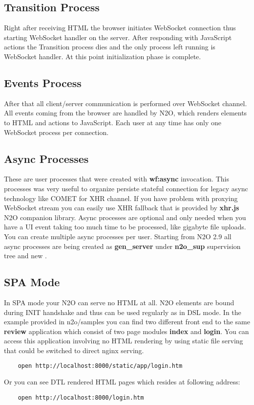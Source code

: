 \subsection{Transition Process}
Right after receiving HTML the browser initiates WebSocket connection
thus starting WebSocket handler on the server. After responding with
JavaScript actions the Transition process dies and the only process left
running is WebSocket handler. At this point initialization phase is complete.

\subsection{Events Process}
After that all client/server communication is performed over
WebSocket channel. All events coming from the browser are
handled by N2O, which renders elements to HTML and actions to
JavaScript. Each user at any time has only one WebSocket process
per connection.

\subsection{Async Processes}
These are user processes that were created with {\bf wf:async} invocation.
This processes was very useful to organize persiste stateful connection
for legacy async technology like COMET for XHR channel. If you have problem with
proxying WebSocket stream you can easily use XHR fallback that is
provided by {\bf xhr.js} N2O companion library.
Async processes are optional and only needed when you have a UI event taking too much
time to be processed, like gigabyte file uploads. You can create
multiple async processes per user. Starting from N2O 2.9 all async
processes are being created as {\bf gen\_server} under
{\bf n2o\_sup} supervision tree and new .

\subsection{SPA Mode}
In SPA mode your N2O can serve no HTML at all. N2O elements are
bound during INIT handshake and thus can be used regularly as in DSL mode.
In the example provided in n2o/samples you can find two different
front end to the same {\bf review} application which consist of
two page modules {\bf index} and {\bf login}. You can access this application
involving no HTML rendering by using static file serving that could be
switched to direct nginx serving.

\begin{lstlisting}
    open http://localhost:8000/static/app/login.htm
\end{lstlisting}

Or you can see DTL rendered HTML pages which resides at following address:

\begin{lstlisting}
    open http://localhost:8000/login.htm
\end{lstlisting}


